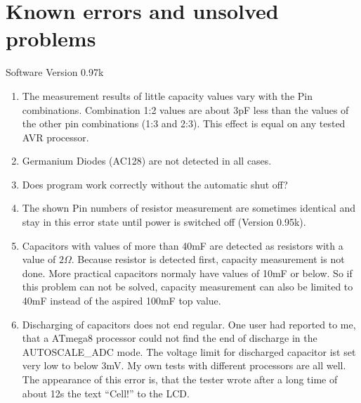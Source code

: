 
\chapter{Known errors and unsolved problems}
{\center Software Version 0.97k}

\begin{enumerate}
\item The measurement results of little capacity values vary with the Pin combinations. Combination 1:2 values are about 3pF less than the values of the other pin combinations  (1:3 and 2:3). This effect is equal on any tested AVR processor.
\item Germanium Diodes (AC128) are not detected in all cases.
\item Does program work correctly without the automatic shut off?
\item The shown Pin numbers of resistor measurement are sometimes identical and stay in this error state until power is switched off
(Version 0.95k).
\item Capacitors with values of more than 40mF are detected as resistors with a value of \(2\Omega\).
Because resistor is detected first, capacity measurement is not done. More practical capacitors normaly have
values of 10mF or below. So if this problem can not be solved, capacity measurement can also be limited to
40mF instead of the aspired 100mF top value.
\item Discharging of capacitors does not end regular. One user had reported to me, that a ATmega8 processor could not
find the end of discharge in the AUTOSCALE\_ADC mode.
The voltage limit for discharged capacitor ist set very low to below 3mV. My own tests with different processors are all well.
The appearance of this error is, that the tester wrote after a long time of about 12s the text ``Cell!'' to the LCD.

\end{enumerate}
